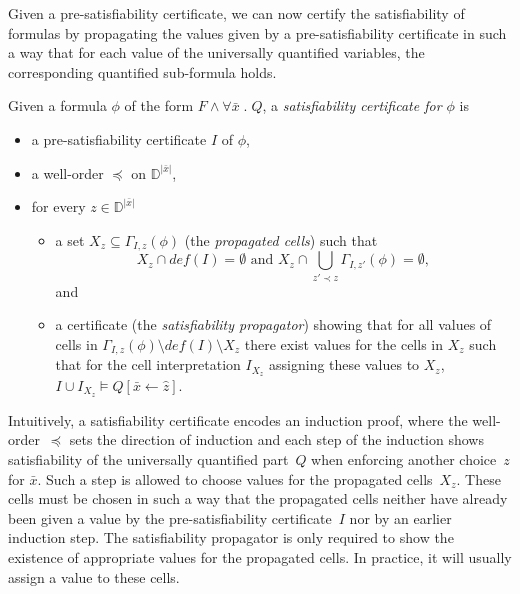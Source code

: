 \documentclass[runningheads]{llncs}
\newcommand{\numvar}[1]{|#1|}
\newcommand{\domain}{\mathbb{D}}
\newcommand{\subst}[3]{#1[#2\leftarrow #3]}
\newcommand{\repr}[1]{\hat{#1}}
\begin{document}
Given a pre-satisfiability certificate, we can now certify the satisfiability of formulas by propagating the values given by a pre-satisfiability certificate in such a way that for each value of the universally quantified variables, the corresponding quantified sub-formula holds.
\begin{definition}%
	\label{def:certificate}
	Given a formula $\phi$  of the form $F\wedge \forall \bar{x}\;.\; Q$, a \emph{satisfiability certificate for $\phi$} is
	\begin{itemize}
        \item a pre-satisfiability certificate $I$ of $\phi$,
		\item a well-order $\preceq$ on $\domain^{\numvar{\bar{x}}}$,%
		\item for every $z\in\domain^{\numvar{\bar{x}}}$
                  \begin{itemize}
                  \item a set $X_z\subseteq \Gamma_{I,z}(\phi)$  (the \emph{propagated cells}) such that \[X_z\cap \mathit{def}(I)=\emptyset \text{ and } X_z\cap\bigcup_{z'\prec z} \Gamma_{I,z'}(\phi)=\emptyset,\] and
                  \item a certificate (the \emph{satisfiability propagator}) showing that for all values of cells in $\Gamma_{I,z}(\phi)\setminus \mathit{def}(I)\setminus X_z$ there exist values for the cells in $X_z$ such that for the cell interpretation $I_{X_z}$ assigning these values to $X_z$, $I\cup I_{X_z}\models \subst{Q}{\bar{x}}{\repr{z}}$.
                  \end{itemize}
       \end{itemize}                
\end{definition}

Intuitively, a satisfiability certificate encodes an induction proof, where the well-order~$\preceq$ sets the direction of induction and each step of the induction shows satisfiability of the universally quantified part~$Q$ when enforcing another choice~$z$ for $\bar{x}$. Such a step is allowed to choose values for the propagated cells~$X_z$. These cells must be chosen in such a way that the propagated cells neither have already been given a value by the pre-satisfiability certificate~$I$ nor by an earlier induction step. The satisfiability propagator is only required to show the existence of appropriate values for the propagated cells. In practice, it will usually assign a value to these cells.
\end{document}
